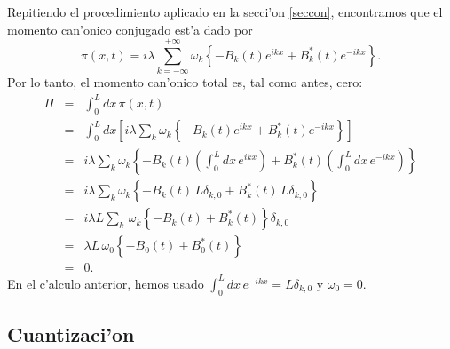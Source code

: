 Repitiendo el procedimiento aplicado en la secci'on \ref{seccon}, encontramos
que el momento can'onico conjugado est'a dado por
\begin{equation}
\pi(x,t)=i\lambda\sum_{k=-\infty}^{+\infty} \omega_k\left\{ -B_k(t)
e^{ikx}+B_k^{\ast}(t) e^{-ikx}\right\}. \label{Pi12}
\end{equation}
Por lo tanto, el momento can'onico total es, tal como antes, cero:
\begin{eqnarray}
\Pi & = &\int_{0}^{L} dx\,\pi(x,t) \\
& = &\int_{0}^{L} dx\left[ i\lambda\sum_k\omega_k\left\{ -B_k(t)
e^{ikx}+B_k^{\ast}(t) e^{-ikx}\right\} \right] \\
& = &i\lambda\sum_k\omega_k\left\{ -B_k(t) \left( \int_{0}^{L}
dx\, e^{ikx}\right) +B_k^{\ast}(t) \left( \int_{0}^{L} dx\, e^{-ikx}\right)
\right\}  \\
& = &i\lambda\sum_k\omega_k\left\{ -B_k(t)\, L\delta_{k,0}
+B_k^{\ast}(t)\, L\delta_{k,0}\right\} \\
& = &i\lambda L\sum_k\,\omega_k\left\{ -B_k(t) +B_k^{\ast}(t) \right\}
\delta_{k,0} \\
& = &\lambda L\, \omega_{0}\left\{ -B_{0}(t) +B_{0}^{\ast}(t) \right\}\\
& = &0 .
\end{eqnarray}
En el c'alculo anterior, hemos usado $\int_{0}^{L} dx\, e^{-ikx}=L\delta_{k,0}$
y
$\omega_{0}=0$.

\subsection{Cuantizaci'on}

